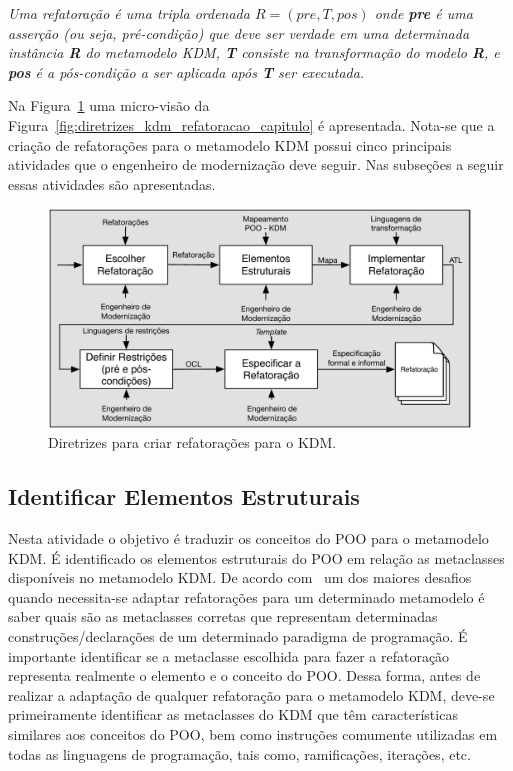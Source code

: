 \begin{definicao}\label{def:refatoracao}
    \textit{Uma refatoração é uma tripla ordenada $R = (pre, T, pos)$ onde \textbf{pre} é uma asserção (ou seja, pré-condição) que deve ser verdade em uma determinada instância \textbf{R} do metamodelo KDM, \textbf{T} consiste na transformação do modelo \textbf{R}, e \textbf{pos} é a pós-condição a ser aplicada após \textbf{T} ser executada.}
\end{definicao}

Na Figura~\ref{fig:todos_os_passos_diretrizes} uma micro-visão da Figura~\ref{fig:diretrizes_kdm_refatoracao_capitulo} é apresentada. Nota-se que a criação de refatorações para o metamodelo KDM possui cinco principais atividades que o engenheiro de modernização deve seguir. Nas subseções a seguir essas atividades são apresentadas. %


\begin{figure}[h]
	\centering
	\caption{Diretrizes para criar refatorações para o KDM.}
	\label{fig:todos_os_passos_diretrizes}
	\includegraphics[scale=0.9]{images/fasesParaConstruirRefatoracoesKDM}
	\fautor
\end{figure}

\subsection{Identificar Elementos Estruturais}\label{sec:mapeamento_POO_e_KDM}

Nesta atividade o objetivo é traduzir os conceitos do POO para o metamodelo KDM. É identificado os elementos estruturais do POO em relação as metaclasses disponíveis no metamodelo KDM. De acordo com~ um dos maiores desafios quando necessita-se adaptar refatorações para um determinado metamodelo é saber quais são as metaclasses corretas que representam determinadas construções/declarações de um determinado paradigma de programação. É importante identificar se a metaclasse escolhida para fazer a refatoração representa realmente o elemento e o conceito do POO. Dessa forma, antes de realizar a adaptação de qualquer refatoração para o metamodelo KDM, deve-se primeiramente identificar as metaclasses do KDM que têm características similares aos conceitos do POO, bem como instruções comumente utilizadas em todas as linguagens de programação, tais como, ramificações, iterações, etc. 

